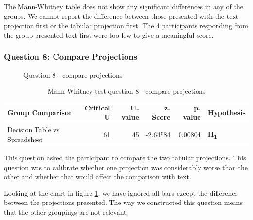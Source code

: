 The Mann-Whitney table does not show any significant differences in any of the groups.
We cannot report the difference between those presented with the text projection first or the tabular projection first.
The 4 participants responding from the group presented text first were too low to give a meaningful score.

\pagebreak
\subsubsection{Question 8: Compare Projections}

\begin{figure}[H]
    \centering
    \caption{Question 8 - compare projections}
    \label{fig:stackedbar_Q4}
\end{figure}

\begin{table}[H]
    \begin{center}
        \begin{tabular}{ |l ||r |r |r | r|l | } 
            \hline
            Group Comparison                 & Critical U & U-value & z-Score  & p-value & Hypothesis         \\
            \hline
            \hline
            Decision Table vs Spreadsheet    & 61         & 45      &  -2.64584& 0.00804 & \textbf{H\textsubscript{1}} \\ 
            \hline
        \end{tabular}
    \end{center}
    \caption{Mann-Whitney test question 8 - compare projections}
    \label{table:mannwhitneyQ4}
\end{table}

This question asked the participant to compare the two tabular projections.  
This question was to calibrate whether one projection was considerably worse than the other and whether that would affect the comparison with text.

Looking at the chart in figure \ref{fig:stackedbar_Q4}, we have ignored all bars except the difference between the projections presented.
The way we constructed this question means that the other groupings are not relevant.

